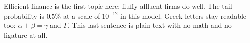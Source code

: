 \documentclass[11pt]{article}
\begin{document}
Efficient finance is the first topic here: fluffy affluent firms do well.
The tail probability is $0.5\%$ at a scale of $10^{-12}$ in this model.
Greek letters stay readable too: $\alpha + \beta = \gamma$ and $\Gamma$.
This last sentence is plain text with no math and no ligature at all.
\end{document}
